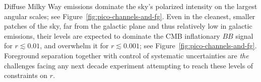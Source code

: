 \documentclass[PICOReport.tex]{subfiles}
\begin{document}

Diffuse Milky Way emissions dominate the sky's polarized intensity on the largest angular scales; see Figure~\ref{fig:pico-channels-and-fg}.  Even in the cleanest, smaller patches of the sky, far from the galactic plane and thus relatively low in galactic emissions, their levels are expected to dominate the CMB inflationary $BB$ signal for $r \lesssim 0.01$, and overwhelm it for $r \lesssim0.001$; see Figure~\ref{fig:pico-channels-and-fg}. Foreground separation together with control of systematic uncertainties are {\it the} challenges facing any next decade experiment attempting to reach these levels of constraints on $r$.
\end{document}
